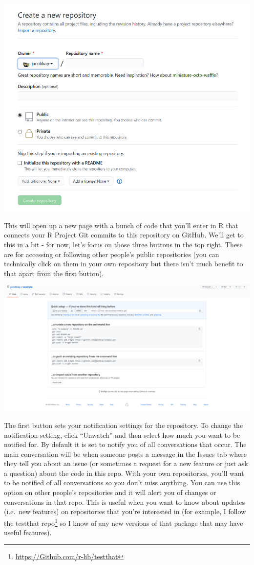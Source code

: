 \documentclass[
]{krantz}
\renewcommand{\href}[2]{#2\footnote{\url{#1}}}
\begin{document}
\includegraphics{images/Github_new_repo2.PNG}

This will open up a new page with a bunch of code that you'll enter in R that connects your R Project Git commits to this repository on GitHub. We'll get to this in a bit - for now, let's focus on those three buttons in the top right. These are for accessing or following other people's public repositories (you can technically click on them in your own repository but there isn't much benefit to that apart from the first button).

\includegraphics{images/Github_new_repo3.PNG}

The first button sets your notification settings for the repository. To change the notification setting, click ``Unwatch'' and then select how much you want to be notified for. By default it is set to notify you of all conversations that occur. The main conversation will be when someone posts a message in the Issues tab where they tell you about an issue (or sometimes a request for a new feature or just ask a question) about the code in this repo. With your own repositories, you'll want to be notified of all conversations so you don't miss anything. You can use this option on other people's repositories and it will alert you of changes or conversations in that repo. This is useful when you want to know about updates (i.e.~new features) on repositories that you're interested in (for example, I follow the \href{https://Github.com/r-lib/testthat}{testthat repo} so I know of any new versions of that package that may have useful features).
\end{document}
